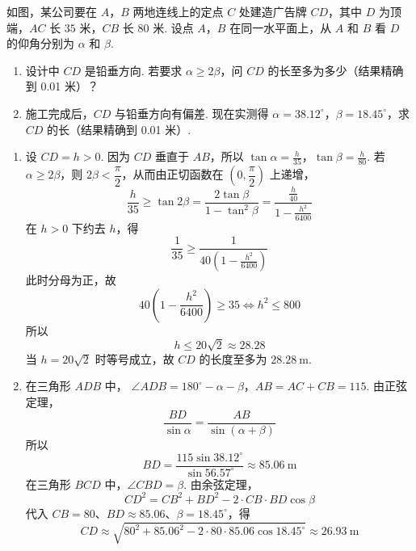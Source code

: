 \begin{problem}
如图，某公司要在 \(A\)，\(B\) 两地连线上的定点 \(C\) 处建造广告牌 \(CD\)，其中 \(D\) 为顶端，\(AC\) 长 \(35\text{ 米}\)，\(CB\) 长 \(80\text{ 米}\). 设点 \(A\)，\(B\) 在同一水平面上，从 \(A\) 和 \(B\) 看 \(D\) 的仰角分别为 \(\alpha\) 和 \(\beta\).

\begin{enumerate}
\item 设计中 \(CD\) 是铅垂方向. 若要求 \(\alpha \geqslant 2\beta\)，问 \(CD\) 的长至多为多少（结果精确到 0.01 米）？
\item 施工完成后，\(CD\) 与铅垂方向有偏差. 现在实测得 \(\alpha = 38.12^{\circ}\)，\(\beta = 18.45^{\circ}\)，求 \(CD\) 的长（结果精确到 0.01 米）.
\end{enumerate}

\end{problem}

\begin{solution}
\begin{enumerate}
\item 设 \(CD=h>0\). 因为 \(CD\) 垂直于 \(AB\)，所以
\(\tan\alpha=\frac h{35}\)，\(\tan\beta=\frac h{80}\).
若 \(\alpha\geqslant2\beta\)，则 \(2\beta<\dfrac\pi2\)，从而由正切函数在 \(\left(0,\dfrac\pi2\right)\) 上递增，
\[
\frac h{35}\geqslant\tan2\beta
=\frac{2\tan\beta}{1-\tan^2\beta}
=\frac{\frac{h}{40}}{1-\frac{h^2}{6400}}
\]
在 \(h>0\) 下约去 \(h\)，得
\[
\frac1{35}\geqslant\frac1{40(1-\frac{h^2}{6400})}
\]
此时分母为正，故
\[
40\left(1-\frac{h^2}{6400}\right)\geqslant35
\iff h^2\leqslant800
\]
所以
\[
h\leqslant20\sqrt2\approx28.28
\]
当 \(h=20\sqrt2\) 时等号成立，故 \(CD\) 的长度至多为 \(28.28\mathrm{~m}\).
\item 在三角形 \(ADB\) 中，
\(\angle ADB=180^\circ-\alpha-\beta\)，\(AB=AC+CB=115\).
由正弦定理，
\[
\frac{BD}{\sin\alpha}
=\frac{AB}{\sin(\alpha+\beta)}
\]
所以
\[
BD=\frac{115\sin38.12^\circ}{\sin56.57^\circ}
\approx85.06\mathrm{~m}
\]
在三角形 \(BCD\) 中，\(\angle CBD=\beta\). 由余弦定理，
\[
CD^2=CB^2+BD^2-2\cdot CB\cdot BD\cos\beta
\]
代入 \(CB=80\)、\(BD\approx85.06\)、\(\beta=18.45^\circ\)，得
\[
CD\approx\sqrt{80^2+85.06^2-2\cdot80\cdot85.06\cos18.45^\circ}
\approx26.93\mathrm{~m}
\]
\end{enumerate}
\end{solution}

